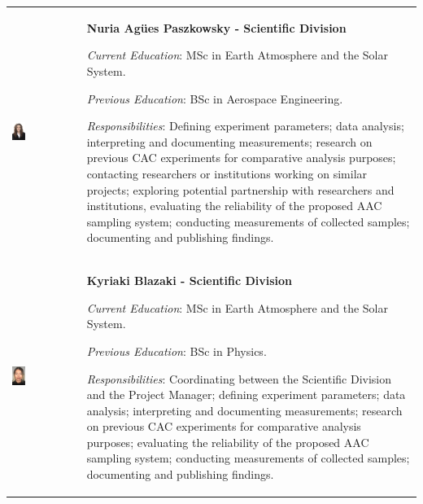 \begin{longtable}[]{m{} m{}}
\includegraphics[width=0.2\textwidth]{1-introduction/img/agues-paszkowsky.jpg} & \textbf{Nuria Agües Paszkowsky - Scientific Division}

\smallskip
\textit{Current Education}: MSc in Earth Atmosphere and the Solar System.

\smallskip
\textit{Previous Education}: BSc in Aerospace Engineering.

\smallskip
\textit{Responsibilities}: Defining experiment parameters; data analysis; interpreting and documenting measurements; research on previous CAC experiments for comparative analysis purposes; contacting researchers or institutions working on similar projects; exploring potential partnership with researchers and institutions, evaluating the reliability of the proposed AAC sampling system; conducting measurements of collected samples; documenting and publishing findings. 
\bigskip
\\

\includegraphics[width=0.2\textwidth]{1-introduction/img/kiki-blazaki.jpg} & \textbf{Kyriaki Blazaki - Scientific Division}

\smallskip
\textit{Current Education}: MSc in Earth Atmosphere and the Solar System.

\smallskip
\textit{Previous Education}: BSc in Physics.


\smallskip
\textit{Responsibilities}: Coordinating between the Scientific Division and the Project Manager; defining experiment parameters; data analysis; interpreting and documenting measurements; research on previous CAC experiments for comparative analysis purposes; evaluating the reliability of the proposed AAC sampling system; conducting measurements of collected samples; documenting and publishing findings. 
\bigskip
\\


\end{longtable}
